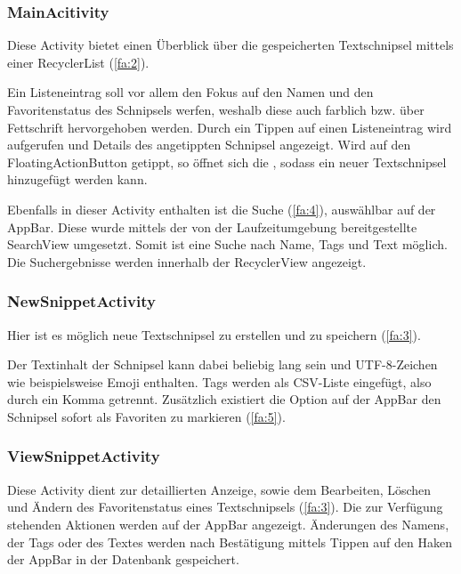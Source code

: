 \documentclass[11pt]{article}
\begin{document}
			\subsubsection{MainAcitivity}
			\label{sec:main}
				Diese Activity bietet einen Überblick über die gespeicherten Textschnipsel mittels einer RecyclerList (\ref{fa:2}).\newline
				
				\noindent Ein Listeneintrag soll vor allem den Fokus auf den Namen und den Favoritenstatus des Schnipsels werfen, weshalb diese auch farblich bzw. über Fettschrift hervorgehoben werden. \newline
				Durch ein Tippen auf einen Listeneintrag wird  aufgerufen und Details des angetippten Schnipsel angezeigt.\newline
				Wird auf den FloatingActionButton getippt, so öffnet sich die , sodass ein neuer Textschnipsel hinzugefügt werden kann.\newline
				
				\noindent Ebenfalls in dieser Activity enthalten ist die Suche (\ref{fa:4}), auswählbar auf der AppBar. Diese wurde mittels der von der Laufzeitumgebung bereitgestellte SearchView umgesetzt. Somit ist eine Suche nach Name, Tags und Text möglich.
				Die Suchergebnisse werden innerhalb der RecyclerView angezeigt.
				
			\subsubsection{New\-Snippet\-Activity}
			\label{sec:new}
				Hier ist es möglich neue Textschnipsel zu erstellen und zu speichern (\ref{fa:3}). \newline
				
				\noindent Der Textinhalt der Schnipsel kann dabei beliebig lang sein und UTF-8-Zeichen wie beispielsweise Emoji enthalten. 
				Tags werden als CSV-Liste eingefügt, also durch ein Komma getrennt. 
				Zusätzlich existiert die Option auf der AppBar den Schnipsel sofort als Favoriten zu markieren (\ref{fa:5}). 
			
			\subsubsection{View\-Snippet\-Activity}
			\label{sec:view}
				Diese Activity dient zur detaillierten Anzeige, sowie dem Bearbeiten, Löschen und Ändern des Favoritenstatus eines Textschnipsels (\ref{fa:3}). 
				Die zur Verfügung stehenden Aktionen werden auf der AppBar angezeigt.
				Änderungen des Namens, der Tags oder des Textes werden nach Bestätigung mittels Tippen auf den Haken der AppBar in der Datenbank gespeichert.
				
\end{document}

